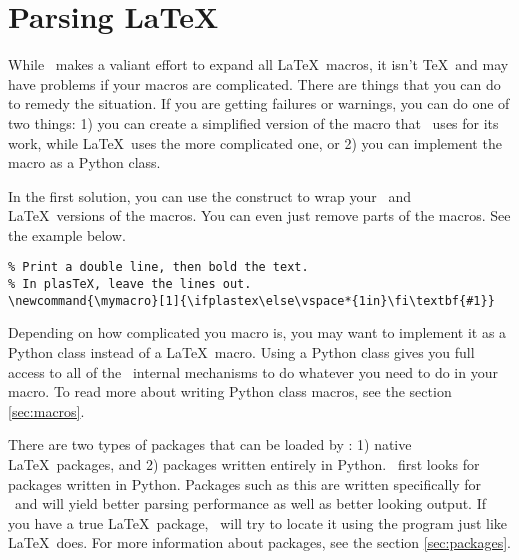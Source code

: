 
\section{Parsing \LaTeX}


While \plasTeX\ makes a valiant effort 
to expand all \LaTeX\ macros, it isn't \TeX\ and may have problems if 
your macros are complicated.  There are things that you can do to remedy the 
situation.  If you are getting failures or warnings, you can do one of two 
things: 1) you can create a simplified version of the macro that \plasTeX\ uses
for its work, while \LaTeX\ uses the more complicated one, or 2) you
can implement the macro as a Python class. 

In the first solution, you can use the  construct to wrap
your \plasTeX\ and \LaTeX\ versions of the macros.  You can even just remove 
parts of the macros.  See the example below.

\begin{verbatim}
% Print a double line, then bold the text.  
% In plasTeX, leave the lines out.
\newcommand{\mymacro}[1]{\ifplastex\else\vspace*{1in}\fi\textbf{#1}}
\end{verbatim}

Depending on how complicated you macro is, you may want to implement it
as a Python class instead of a \LaTeX\ macro.  Using a Python class 
gives you full access to all of the \plasTeX\ internal mechanisms to 
do whatever you need to do in your macro.  To read more about writing
Python class macros, see the section \ref{sec:macros}.


There are two types of packages that can be loaded by \plasTeX: 1) native
\LaTeX\ packages, and 2) packages written entirely in Python.  \plasTeX\
first looks for packages written in Python.  Packages such as this are
written specifically for \plasTeX\ and will yield better parsing performance
as well as better looking output. 
If you have a true \LaTeX\ package, \plasTeX\ will try to locate it using
the \program{kpsewhich} program just like \LaTeX\ does.
For more information about packages, see the section \ref{sec:packages}.

